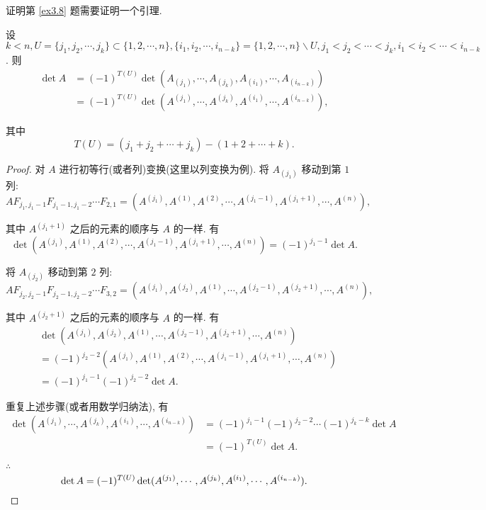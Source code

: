 \documentclass{ctexart}
\begin{document}
证明第 \ref{ex3.8} 题需要证明一个引理.
\begin{lemma}\label{l5.1}
    设 $k<n,U=\{j_1,j_2,\cdots,j_k\}\subset\{1,2,\cdots,n\},\{i_1,i_2,\cdots,i_{n-k}\}=\{1,2,\cdots,n\}\backslash U,j_1<j_2<\cdots<j_k,i_1<i_2<\cdots<i_{n-k}$. 则
    \begin{align*}
        \det A & =(-1)^{T(U)}\det(A_{(j_1)},\cdots,A_{(j_k)},A_{(i_1)},\cdots,A_{(i_{n-k})}) \\
        & =(-1)^{T(U)}\det(A^{(j_1)},\cdots,A^{(j_k)},A^{(i_1)},\cdots,A^{(i_{n-k})}),
    \end{align*}

    其中
    \[T(U)=(j_1+j_2+\cdots+j_k)-(1+2+\cdots+k).\]
\end{lemma}
\begin{proof}
    对 $A$ 进行初等行(或者列)变换(这里以列变换为例). 将 $A_{(j_{1})}$ 移动到第 $1$ 列:
    \[AF_{j_1,j_1-1}F_{j_1-1,j_1-2}\cdots F_{2,1}=(A^{(j_1)},A^{(1)},A^{(2)},\cdots,A^{(j_{1}-1)},A^{(j_{1}+1)},\cdots,A^{(n)}),\]

    其中 $A^{(j_{1}+1)}$ 之后的元素的顺序与 $A$ 的一样. 有
    \[\det(A^{(j_1)},A^{(1)},A^{(2)},\cdots,A^{(j_{1}-1)},A^{(j_{1}+1)},\cdots,A^{(n)})=(-1)^{j_1-1}\det A.\]

    将 $A_{(j_{2})}$ 移动到第 $2$ 列:
    \[AF_{j_2,j_2-1}F_{j_2-1,j_2-2}\cdots F_{3,2}=(A^{(j_1)},A^{(j_2)},A^{(1)},\cdots,A^{(j_{2}-1)},A^{(j_{2}+1)},\cdots,A^{(n)}),\]

    其中 $A^{(j_{2}+1)}$ 之后的元素的顺序与 $A$ 的一样. 有
    \begin{align*}
        & \det(A^{(j_1)},A^{(j_2)},A^{(1)},\cdots,A^{(j_{2}-1)},A^{(j_{2}+1)},\cdots,A^{(n)}) \\
        & =(-1)^{j_2-2}(A^{(j_1)},A^{(1)},A^{(2)},\cdots,A^{(j_{1}-1)},A^{(j_{1}+1)},\cdots,A^{(n)}) \\
        & =(-1)^{j_1-1}(-1)^{j_2-2}\det A.
    \end{align*}

    重复上述步骤(或者用数学归纳法), 有
    \begin{align*}
        \det(A^{(j_1)},\cdots,A^{(j_k)},A^{(i_1)},\cdots,A^{(i_{n-k})}) & =(-1)^{j_1-1}(-1)^{j_2-2}\cdots(-1)^{j_k-k}\det A \\
        & =(-1)^{T(U)}\det A.
    \end{align*}

    $\therefore$
    \[\det A=(-1)^{T(U)}\det(A^{(j_1)},\cdots,A^{(j_k)},A^{(i_1)},\cdots,A^{(i_{n-k})}).\qedhere\]
\end{proof}
\end{document}
